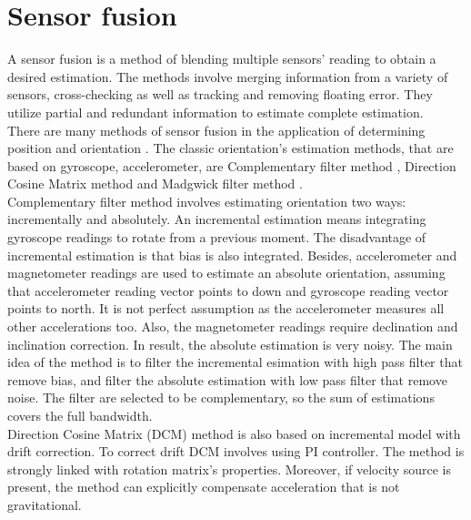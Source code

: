 \chapter{Sensor fusion}

A sensor fusion is a method of blending multiple sensors' reading to obtain a desired estimation. The methods involve merging information from a variety of sensors, cross-checking as well as tracking and removing floating error. They utilize partial and redundant information to estimate complete estimation.\\

There are many methods of sensor fusion in the application of determining position and orientation \cite{uav}. The classic orientation's estimation methods, that are based on gyroscope, accelerometer, are Complementary filter method \cite{complementary}, Direction Cosine Matrix method \cite{dcm} and Madgwick filter method \cite{madgwick}. \\

Complementary filter method involves estimating orientation two ways: incrementally and absolutely. An incremental estimation means integrating gyroscope readings to rotate from a previous moment. The disadvantage of incremental estimation is that bias is also integrated. Besides, accelerometer and magnetometer readings are used to estimate an absolute orientation, assuming that accelerometer reading vector points to down and gyroscope reading vector points to north. It is not perfect assumption as the accelerometer measures all other accelerations too. Also, the magnetometer readings require declination and inclination correction. In result, the absolute estimation is very noisy. The main idea of the method is to filter the incremental esimation with high pass filter that remove bias, and filter the absolute estimation with low pass filter that remove noise. The filter are selected to be complementary, so the sum of estimations covers the full bandwidth.\\

Direction Cosine Matrix (DCM) method is also based on incremental model with drift correction.
To correct drift DCM involves using PI controller. The method is strongly linked with rotation matrix's properties. Moreover, if velocity source is present, the method can explicitly compensate acceleration that is not gravitational. \\

